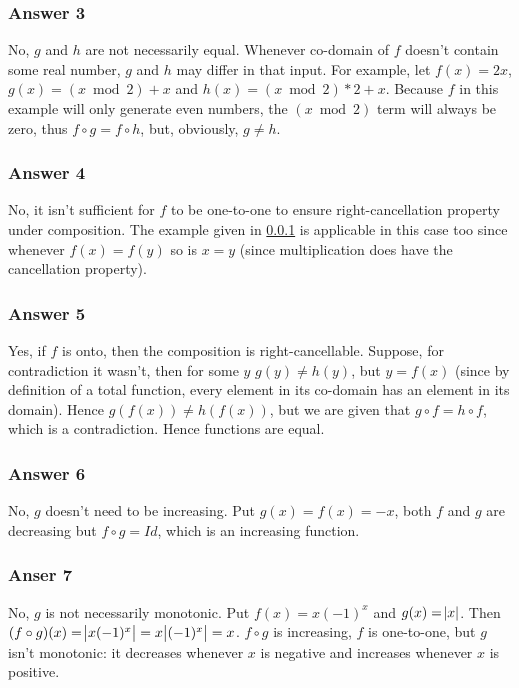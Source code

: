 \documentclass[11pt]{article}
\begin{document}
\subsubsection{Answer 3}
\label{sec-1-2-1}
No, $g$ and $h$ are not necessarily equal.  Whenever co-domain of $f$
doesn't contain some real number, $g$ and $h$ may differ in that input.
For example, let $f(x) = 2x$, $g(x) = (x \bmod 2) + x$ and
$h(x) = (x \bmod 2) * 2 + x$.  Because $f$ in this example will only
generate even numbers, the $(x \bmod 2)$ term will always be zero,
thus $f \circ g = f \circ h$, but, obviously, $g \neq h$.
\subsubsection{Answer 4}
\label{sec-1-2-2}
No, it isn't sufficient for $f$ to be one-to-one to ensure right-cancellation
property under composition.  The example given in \ref{sec-1-2-1} is applicable
in this case too since whenever $f(x) = f(y)$ so is $x = y$ (since multiplication
does have the cancellation property).
\subsubsection{Answer 5}
\label{sec-1-2-3}
Yes, if $f$ is onto, then the composition is right-cancellable.  Suppose,
for contradiction it wasn't, then for some $y$ $g(y) \neq h(y)$, but
$y = f(x)$ (since by definition of a total function, every element in
its co-domain has an element in its domain).  Hence $g(f(x)) \neq h(f(x))$,
but we are given that $g \circ f = h \circ f$, which is a contradiction.
Hence functions are equal.
\subsubsection{Answer 6}
\label{sec-1-2-4}
No, $g$ doesn't need to be increasing.  Put $g(x) = f(x) = -x$, both $f$
and $g$ are decreasing but $f \circ g = Id$, which is an increasing function.
\subsubsection{Anser 7}
\label{sec-1-2-5}
No, $g$ is not necessarily monotonic.  Put $f(x) = x(-1)^x$ and $g(x) = \abs{x}$.
Then $(f \circ g)(x) = \abs{x(-1)^x} = x\abs{(-1)^x} = x$.  $f \circ g$ is
increasing, $f$ is one-to-one, but $g$ isn't monotonic: it decreases whenever
$x$ is negative and increases whenever $x$ is positive.
\end{document}
